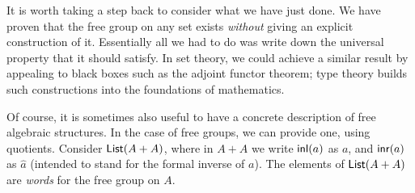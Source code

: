 It is worth taking a step back to consider what we have just done.
We have proven that the free group on any set exists \emph{without} giving an explicit construction of it.
Essentially all we had to do was write down the universal property that it should satisfy.
In set theory, we could achieve a similar result by appealing to black boxes such as the adjoint functor theorem; type theory builds such constructions into the foundations of mathematics.

Of course, it is sometimes also useful to have a concrete description of free algebraic structures.
In the case of free groups, we can provide one, using quotients.
Consider $\mathsf{List}(A+A)$, where in $A+A$ we write ${\mathsf{inl}}(a)$ as $a$, and ${\mathsf{inr}}(a)$ as $\hat{a}$ (intended to stand for the formal inverse of $a$).
The elements of $\mathsf{List}(A+A)$ are \emph{words} for the free group on $A$.

